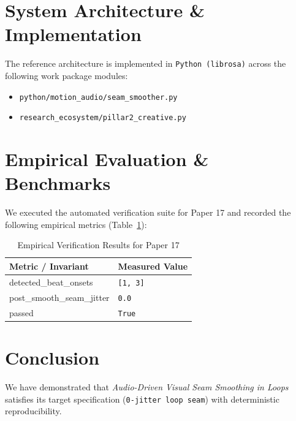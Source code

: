 \documentclass[10pt,twocolumn]{article}
\begin{document}
\section{System Architecture \& Implementation}
The reference architecture is implemented in \texttt{Python (librosa)} across the following work package modules:
\begin{itemize}
  \item \texttt{python/motion\_audio/seam\_smoother.py}
  \item \texttt{research\_ecosystem/pillar2\_creative.py}
\end{itemize}

\section{Empirical Evaluation \& Benchmarks}
We executed the automated verification suite for Paper 17 and recorded the following empirical metrics (Table~\ref{tab:metrics}):

\begin{table}[htbp]
\centering
\caption{Empirical Verification Results for Paper 17}
\label{tab:metrics}
\begin{tabular}{ll}
\toprule
\textbf{Metric / Invariant} & \textbf{Measured Value} \\
\midrule
    detected\_beat\_onsets & \texttt{[1, 3]} \\
    post\_smooth\_seam\_jitter & \texttt{0.0} \\
    passed & \texttt{True} \\
\bottomrule
\end{tabular}
\end{table}

\section{Conclusion}
We have demonstrated that \textit{Audio-Driven Visual Seam Smoothing in Loops} satisfies its target specification (\texttt{0-jitter loop seam}) with deterministic reproducibility.



\end{document}
